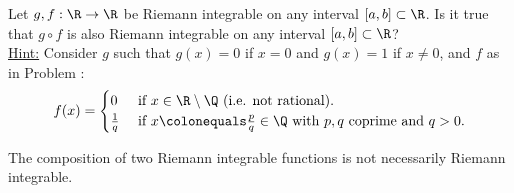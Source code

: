\begin{problem}
  Let $g, f : \R \to \R$ be Riemann integrable on any interval $[a, b] \subset \R$.
  Is it true that $g \circ f$ is also Riemann integrable on any interval $[a, b] \subset \R$?\\
  \underline{Hint:} Consider $g$ such that $g(x) = 0$ if $x = 0$
  and $g(x) = 1$ if $x \neq 0$, and $f$ as in Problem :
  \[
    f(x) = \begin{cases}
      0 & \text{ if } x \in \R \setminus \Q \text{ (i.e. not rational).}\\
      \frac{1}{q} & \text{ if } x \colonequals \frac{p}{q} \in \Q
      \text{ with $p, q$ coprime and $q > 0$}.
    \end{cases}
  \]
\end{problem}

  \begin{claim}
    The composition of two Riemann integrable functions is not necessarily Riemann integrable.
  \end{claim}
